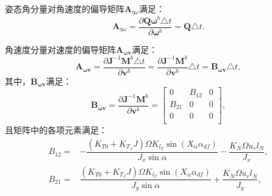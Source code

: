 姿态角分量对角速度的偏导矩阵$\boldsymbol{A}_{\eta\omega}$满足：
\begin{equation}
    \boldsymbol{A}_{\eta\omega} = \frac{\partial \boldsymbol{Q}\boldsymbol{\omega}^b \triangle t}{\partial \boldsymbol{\omega}^b} = \boldsymbol{Q}\triangle t.
\end{equation}

角速度分量对速度的偏导矩阵$\boldsymbol{A}_{\boldsymbol{\omega v}}$满足：
\begin{equation}
    \boldsymbol{A}_{\boldsymbol{\omega v}} = \frac{\partial \boldsymbol{J}^{-1} \boldsymbol{M}^b \triangle t}{\partial \boldsymbol{v}^b} = \frac{\partial \boldsymbol{J}^{-1} \boldsymbol{M}^b}{\partial \boldsymbol{v}^b} \triangle t = \boldsymbol{B}_{\boldsymbol{\omega v}}\triangle t,
\end{equation}
其中，$\boldsymbol{B}_{\boldsymbol{\omega v}}$满足：
\begin{equation}
    \boldsymbol{B}_{\boldsymbol{\omega v}} = \frac{\partial \boldsymbol{J}^{-1} \boldsymbol{M}^b}{\partial \boldsymbol{v}^b} = 
    \begin{bmatrix}
        0 & B_{12} & 0 \\
        B_{21} & 0 & 0 \\
        0 & 0 & 0 \\
    \end{bmatrix},
\end{equation}
且矩阵中的各项元素满足：
\begin{equation}
    \begin{aligned}
        B_{12} =& -\dfrac{(K_{T0} + K_{T_J}J) \Omega K_{l_T} \sin(X_\alpha \alpha_{df}) }{J_x \sin\alpha} - \dfrac{K_{N} \Omega u_r l_N}{J_x}, \\[6pt]
        B_{21} =& \dfrac{(K_{T0} + K_{T_J}J) \Omega K_{l_T} \sin(X_\alpha \alpha_{df}) }{J_y \sin\alpha} + \dfrac{K_{N} \Omega u_r l_N}{J_y}, \\[6pt]
    \end{aligned}
\end{equation}

